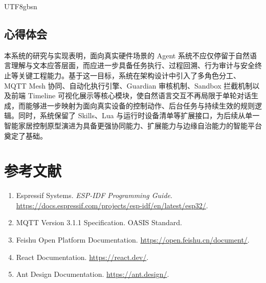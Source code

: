 \documentclass[a4paper,12pt]{article}
\begin{document}
\begin{CJK*}{UTF8}{gbsn}
\subsection{心得体会}
本系统的研究与实现表明，面向真实硬件场景的 Agent 系统不应仅停留于自然语言理解与文本应答层面，而应进一步具备任务执行、过程回溯、行为审计与安全终止等关键工程能力。基于这一目标，系统在架构设计中引入了多角色分工、MQTT Mesh 协同、自动化执行引擎、Guardian 审核机制、Sandbox 拦截机制以及前端 Timeline 可视化展示等核心模块，使自然语言交互不再局限于单轮对话生成，而能够进一步映射为面向真实设备的控制动作、后台任务与持续生效的规则逻辑。同时，系统保留了 Skills、Lua 与运行时设备清单等扩展接口，为后续从单一智能家居控制原型演进为具备更强协同能力、扩展能力与边缘自治能力的智能平台奠定了基础。

\section{参考文献}
\begin{enumerate}
  \item Espressif Systems. \textit{ESP-IDF Programming Guide}. \url{https://docs.espressif.com/projects/esp-idf/en/latest/esp32/}.
  \item MQTT Version 3.1.1 Specification. OASIS Standard.
  \item Feishu Open Platform Documentation. \url{https://open.feishu.cn/document/}.
  \item React Documentation. \url{https://react.dev/}.
  \item Ant Design Documentation. \url{https://ant.design/}.
\end{enumerate}

\end{CJK*}
\end{document}
